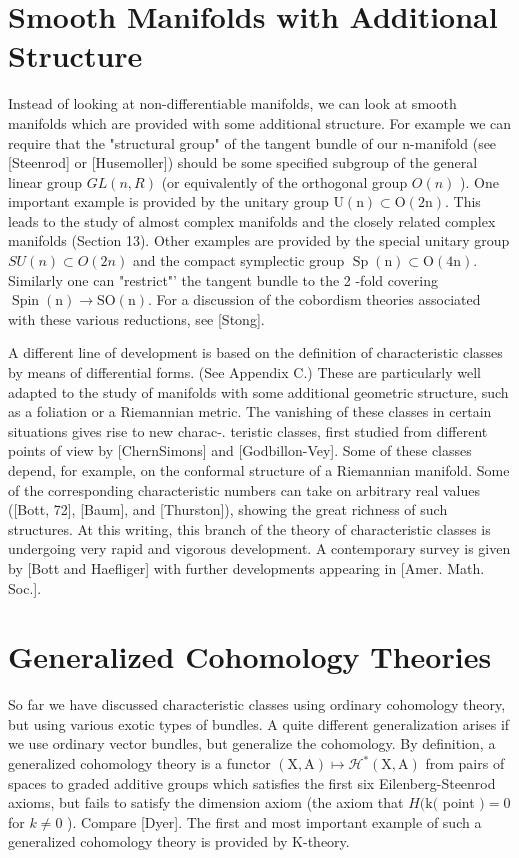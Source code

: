 \documentclass[10pt]{article}
\begin{document}
\section{Smooth Manifolds with Additional Structure}
Instead of looking at non-differentiable manifolds, we can look at smooth manifolds which are provided with some additional structure. For example we can require that the "structural group" of the tangent bundle of our n-manifold (see [Steenrod] or [Husemoller]) should be some specified subgroup of the general linear group $G L(n, R)$ (or equivalently of the orthogonal group $O(n)$ ). One important example is provided by the unitary group $\mathrm{U}(\mathrm{n}) \subset \mathrm{O}(2 \mathrm{n})$. This leads to the study of almost complex manifolds and the closely related complex manifolds (Section 13). Other examples are provided by the special unitary group $S U(n) \subset O(2 n)$ and the compact symplectic group $\operatorname{Sp}(\mathrm{n}) \subset \mathrm{O}(4 \mathrm{n})$. Similarly one can "restrict"' the tangent bundle to the 2 -fold covering $\operatorname{Spin}(\mathrm{n}) \rightarrow \mathrm{SO}(\mathrm{n})$. For a discussion of the cobordism theories associated with these various reductions, see [Stong].

A different line of development is based on the definition of characteristic classes by means of differential forms. (See Appendix C.) These are particularly well adapted to the study of manifolds with some additional geometric structure, such as a foliation or a Riemannian metric. The vanishing of these classes in certain situations gives rise to new charac-. teristic classes, first studied from different points of view by [ChernSimons] and [Godbillon-Vey]. Some of these classes depend, for example, on the conformal structure of a Riemannian manifold. Some of the corresponding characteristic numbers can take on arbitrary real values ([Bott, 72], [Baum], and [Thurston]), showing the great richness of such structures. At this writing, this branch of the theory of characteristic classes is undergoing very rapid and vigorous development. A contemporary survey is given by [Bott and Haefliger] with further developments appearing in [Amer. Math. Soc.].

\section{Generalized Cohomology Theories}
So far we have discussed characteristic classes using ordinary cohomology theory, but using various exotic types of bundles. A quite different generalization arises if we use ordinary vector bundles, but generalize the cohomology. By definition, a generalized cohomology theory is a functor $(\mathrm{X}, \mathrm{A}) \mapsto \mathcal{H}^{*}(\mathrm{X}, \mathrm{A})$ from pairs of spaces to graded additive groups which satisfies the first six Eilenberg-Steenrod axioms, but fails to satisfy the dimension axiom (the axiom that $H(\mathrm{k}($ point $)=0$ for $k \neq 0$ ). Compare [Dyer]. The first and most important example of such a generalized cohomology theory is provided by $\mathrm{K}$-theory.
\end{document}
